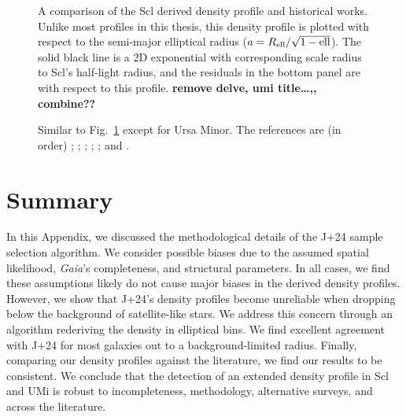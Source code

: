 \begin{figure}
\centering
{}
\caption[Sculptor literature density profiles]{A comparison of the Scl
derived density profile and historical works. Unlike most profiles in
this thesis, this density profile is plotted with respect to the
semi-major elliptical radius (\(a = R_{\rm ell} / \sqrt{1-{\rm ell}}\)).
The solid black line is a 2D exponential with corresponding scale radius
to Scl's half-light radius, and the residuals in the bottom panel are
with respect to this profile. \textbf{remove delve, umi title\ldots,,
combine??}}\label{fig:scl_lit_profiles}
\end{figure}

\begin{figure}
\centering
{}
\caption[Ursa Minor literature density profiles]{Similar to
Fig.~\ref{fig:scl_lit_profiles} except for Ursa Minor. The references
are (in order) \citet{sato+2025}; \citet{palma+2003};
\citet{martinez-delgado+2001}; \citet{kleyna+1998}; \citet{IH1995}; and
\citet{Hodge1964}.}
\end{figure}

\section{Summary}\label{summary}

In this Appendix, we discussed the methodological details of the J+24
sample selection algorithm. We consider possible biases due to the
assumed spatial likelihood, \emph{Gaia}'s completeness, and structural
parameters. In all cases, we find these assumptions likely do not cause
major biases in the derived density profiles. However, we show that
J+24's density profiles become unreliable when dropping below the
background of satellite-like stars. We address this concern through an
algorithm rederiving the density in elliptical bins. We find excellent
agreement with J+24 for most galaxies out to a background-limited
radius. Finally, comparing our density profiles against the literature,
we find our results to be consistent. We conclude that the detection of
an extended density profile in Scl and UMi is robust to incompleteness,
methodology, alternative surveys, and across the literature.
